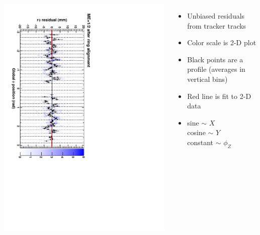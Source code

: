\documentclass[compress]{beamer}
\begin{document}
\begin{frame}
\begin{columns}
\includegraphics[height=\linewidth, angle=90]{ringfits_after/mep12.pdf}
\begin{itemize}
\item Unbiased residuals from tracker tracks
\item Color scale is 2-D plot
\item Black points are a profile (averages in vertical bins)
\item Red line is fit to 2-D data
\item sine $\sim$ $X$ \\
cosine $\sim$ $Y$ \\
constant $\sim$ $\phi_Z$
\end{itemize}
\end{columns}
\end{frame}
\end{document}
